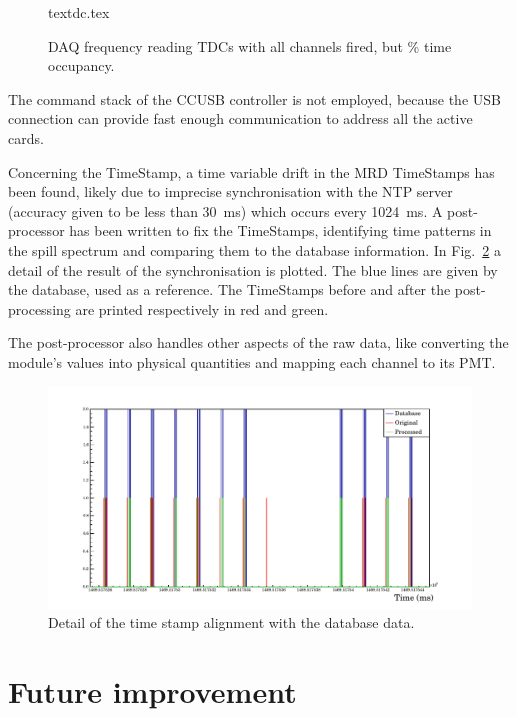 \begin{figure}
  \centering
  {textdc.tex}
    \caption{DAQ frequency reading TDCs with all channels fired, but \% time occupancy.}
  \label{fig:tdcfreq}
\end{figure}

 The command stack of the CCUSB controller is not employed, because the USB connection can provide %
 fast enough communication to address all the active cards.

 Concerning the TimeStamp, a time variable drift in the MRD TimeStamps has been found, %
 likely due to imprecise synchronisation with the NTP server %
 (accuracy given to be less than 30~ms) which occurs every 1024~ms. 
 A post-processor has been written to fix the TimeStamps, identifying time patterns in the %
 spill spectrum and comparing them to the database information.
 In Fig.~\ref{fig:tdcpost} a detail of the result of the synchronisation is plotted.
 The blue lines are given by the database, used as a reference.
 The TimeStamps before and after the post-processing are printed respectively in red and green.

 The post-processor also handles other aspects of the raw data, like converting the module's values %
 into physical quantities and mapping each channel to its PMT.

\begin{figure}
  \centering
  \includegraphics[scale=0.7]{pics/textime.pdf}
  \caption{Detail of the time stamp alignment with the database data.}
  \label{fig:tdcpost}
\end{figure}

\section{Future improvement}
\label{sec:future}


